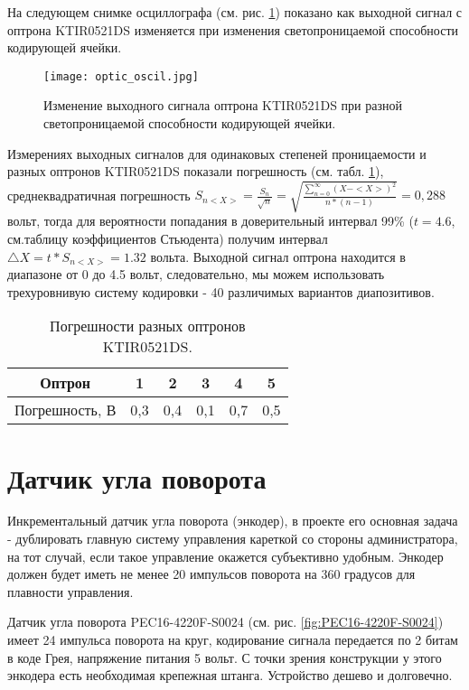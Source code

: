 На следующем снимке осциллографа (см. рис. \ref{fig:optic_oscil}) показано как выходной сигнал с оптрона KTIR0521DS изменяется при изменения светопроницаемой способности кодирующей ячейки.

\begin{figure}[h]
	\centering
     \texttt{[image: optic\_oscil.jpg]}
	\caption
	{
	Изменение выходного сигнала оптрона KTIR0521DS при разной светопроницаемой способности кодирующей ячейки.
	}
	\label{fig:optic_oscil}
\end{figure}

Измерениях выходных сигналов для одинаковых степеней проницаемости и разных оптронов KTIR0521DS показали погрешность (см. табл. \ref{tab:optical_error}), среднеквадратичная погрешность $ S_{n<X>}=\frac{S_{n}}{\sqrt{n}}=\sqrt{\frac{\sum_{n=0}^\infty(X-<X>)^{2}}{n*(n-1)}}= 0,288$ вольт, тогда для вероятности попадания в доверительный интервал 99\% ($t=4.6$, см.таблицу коэффициентов Стьюдента) получим интервал  $ \triangle X = t*S_{n<X>}=1.32$ вольта. Выходной сигнал оптрона находится в диапазоне от 0 до 4.5 вольт, следовательно, мы можем использовать трехуровнивую систему кодировки - 40 различимых вариантов диапозитивов.
\begin{table}
	\centering
\begin{tabular}{|c|c|c|c|c|c|}
\hline 
Оптрон & 1 & 2 & 3 & 4 & 5 \\ 
\hline 
Погрешность, В & 0,3 & 0,4 & 0,1 & 0,7 & 0,5 \\ 
\hline 
\end{tabular} 
	\caption{Погрешности разных оптронов KTIR0521DS.}
	\label{tab:optical_error}
\end{table}

\section{Датчик угла поворота}
%
Инкрементальный датчик угла поворота (энкодер), в проекте его основная задача - дублировать главную систему управления кареткой со стороны администратора, на тот случай, если такое управление окажется субъективно удобным. Энкодер должен будет иметь не менее 20 импульсов поворота на 360 градусов для плавности управления.

Датчик угла поворота PEC16-4220F-S0024 (см. рис. \ref{fig:PEC16-4220F-S0024}) имеет 24 импульса поворота на круг, кодирование сигнала передается по 2 битам в коде Грея, напряжение питания 5 вольт. С точки зрения конструкции у этого энкодера есть необходимая крепежная штанга. Устройство дешево и долговечно.

